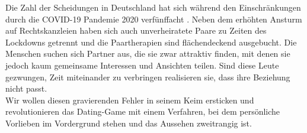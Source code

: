 Die Zahl der Scheidungen in Deutschland hat sich während den Einschränkungen durch die COVID-19 Pandemie 2020 verfünffacht \cite{scheidungen}. Neben dem erhöhten Ansturm auf Rechtskanzleien haben sich auch unverheiratete Paare zu Zeiten des Lockdowns getrennt und die Paartherapien sind flächendeckend ausgebucht. Die Menschen suchen sich Partner aus, die sie zwar attraktiv finden, mit denen sie jedoch kaum gemeinsame Interessen und Ansichten teilen. Sind diese Leute gezwungen, Zeit miteinander zu verbringen realisieren sie, dass ihre Beziehung nicht passt.\\
Wir wollen diesen gravierenden Fehler in seinem Keim ersticken und revolutionieren das Dating-Game mit einem Verfahren, bei dem persönliche Vorlieben im Vordergrund stehen und das Aussehen zweitrangig ist.


